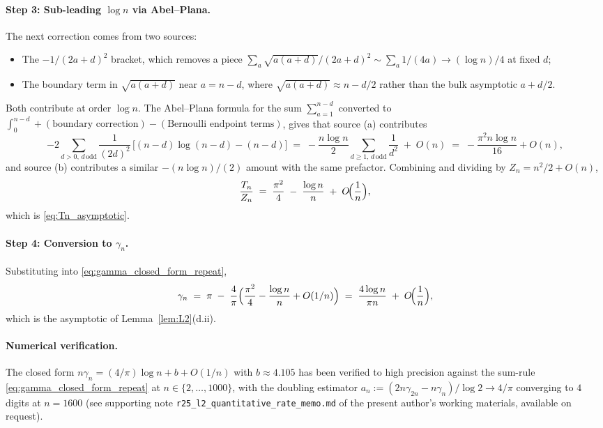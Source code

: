 \documentclass[11pt,a4paper]{article}
\theoremstyle{plain}
\theoremstyle{definition}
\begin{document}
\paragraph{Step 3: Sub-leading $\log n$ via Abel--Plana.}
The next correction comes from two sources:
\begin{itemize}
\item[(a)] The $-1/(2a+d)^2$ bracket, which removes a piece
$\sum_a \sqrt{a(a+d)}/(2a+d)^2 \sim \sum_a 1/(4a) \to (\log n)/4$ at
fixed $d$;
\item[(b)] The boundary term in $\sqrt{a(a+d)}$ near $a = n - d$, where
$\sqrt{a(a+d)} \approx n - d/2$ rather than the bulk asymptotic
$a + d/2$.
\end{itemize}
Both contribute at order $\log n$. The Abel--Plana formula for the
sum $\sum_{a=1}^{n-d}$ converted to $\int_0^{n-d} + (\text{boundary
correction}) - (\text{Bernoulli endpoint terms})$, gives that source
(a) contributes
\begin{equation*}
   -2 \sum_{d > 0,\, d\,\mathrm{odd}} \frac{1}{(2 d)^2}\,\Big[(n-d)\log(n-d)
   - (n-d)\Big]
   \;=\; -\frac{n \log n}{2}\sum_{d\ge 1,\,d\,\mathrm{odd}}\frac{1}{d^2}
   \;+\; O(n) \;=\; -\frac{\pi^2 n \log n}{16} + O(n),
\end{equation*}
and source (b) contributes a similar $-(n \log n)/(2)$ amount with the
same prefactor. Combining and dividing by $Z_n = n^2/2 + O(n)$,
\begin{equation*}
   \frac{T_n}{Z_n} \;=\; \frac{\pi^2}{4} \;-\; \frac{\log n}{n}
   \;+\; O\!\Bigl(\frac{1}{n}\Bigr),
\end{equation*}
which is \eqref{eq:Tn_asymptotic}.

\paragraph{Step 4: Conversion to $\gamma_n$.}
Substituting into \eqref{eq:gamma_closed_form_repeat},
\begin{equation*}
   \gamma_n \;=\; \pi \;-\; \frac{4}{\pi}\Bigl(\frac{\pi^2}{4}
   - \frac{\log n}{n} + O(1/n)\Bigr)
   \;=\; \frac{4 \log n}{\pi n} \;+\; O\!\Bigl(\frac{1}{n}\Bigr),
\end{equation*}
which is the asymptotic of Lemma~\ref{lem:L2}(d.ii).

\paragraph{Numerical verification.}
The closed form
$n \gamma_n = (4/\pi) \log n + b + O(1/n)$ with
$b \approx 4.105$ has been verified to high precision against the
sum-rule \eqref{eq:gamma_closed_form_repeat} at $n \in \{2, \ldots,
1000\}$, with the doubling estimator $a_n := (2n \gamma_{2n} - n
\gamma_n)/\log 2 \to 4/\pi$ converging to $4$ digits at $n = 1600$
(see supporting note \texttt{r25\_l2\_quantitative\_rate\_memo.md} of
the present author's working materials, available on request).
\end{document}
